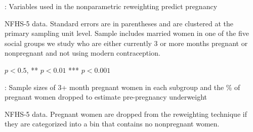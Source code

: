 \documentclass[12pt]{article}
\begin{document}
\begin{landscape}

\newpage
\begin{table}[H]
    \centering
    \begin{threeparttable}
        \caption{: Variables used in the nonparametric reweighting predict pregnancy}
        \label{tab:regression}

        \footnotesize
        \setlength{\tabcolsep}{15pt}
        \renewcommand{\arraystretch}{1.5}

        {}

        \begin{tablenotes}
            \item NFHS-5 data. Standard errors are in parentheses and are clustered at the primary sampling unit level. Sample includes married women in one of the five social groups we study who are either currently 3 or more months pregnant or nonpregnant and not using modern contraception.
            \item * $p<0.5$, ** $p<0.01$ *** $p<0.001$ 
        \end{tablenotes}
    \end{threeparttable}
\end{table}





\begin{table}[H]
    \centering
    \small %

    \begin{threeparttable}
        
    
    \caption{: Sample sizes of 3+ month pregnant women in each subgroup and the \% of pregnant women dropped to estimate pre-pregnancy underweight}
    \label{tab:sampledropped}
    \renewcommand{\arraystretch}{1}
    \begin{adjustbox}{center,max width=\linewidth, totalheight=0.9\textheight,keepaspectratio}
    
    \end{adjustbox}
    
    \begin{tablenotes}
    \footnotesize
    \item \parbox{\textwidth}{
        NFHS-5 data. Pregnant women are dropped from the reweighting technique if they are categorized into a bin that contains no nonpregnant women. 
    }
    \end{tablenotes}

    \end{threeparttable}
\end{table}

\end{landscape}
\end{document}
